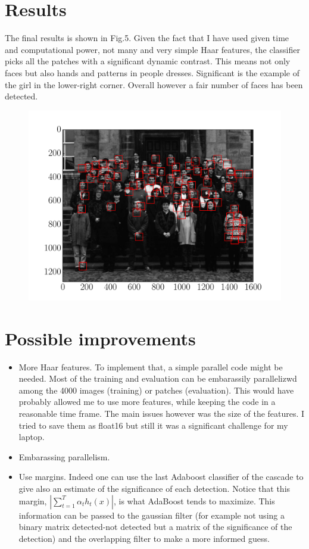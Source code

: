 \documentclass[11pt]{amsart}
\begin{document}
\section{Results}

The final results is shown in Fig.5. 
Given the fact that I have used given time and computational power, not many and very simple Haar features, the classifier picks all the patches with a significant dynamic contrast.
This means not only faces but also hands and patterns in people dresses. Significant is the example of the girl in the lower-right corner. Overall however a fair number of faces has been detected.

\begin{figure}[htbp]
\begin{center}
\includegraphics[scale=0.5]{final.pdf}
\caption{}
\label{default}
\end{center}
\end{figure}

\section{Possible improvements}
\begin{itemize}
\item More Haar features. To implement that, a simple parallel code might be needed. Most of the training and evaluation can be embarassily parallelizwd among the 4000 images (training) or patches (evaluation). This would have probably allowed me to use more features, while keeping the code in a reasonable time frame. The main issues however was the size of the features. I tried to save them as float16 but still it was a significant challenge for my laptop.

\item Embarassing parallelism.
\item Use margins. Indeed one can use the last Adaboost classifier of the cascade to give also an estimate of the significance of each detection. Notice that this margin, $|\sum^{T}_{t=1}\alpha_{t}h_{t}(x)|$, is what AdaBoost tends to maximize. This information can be passed to the gaussian filter (for example not using a binary matrix detected-not detected but a matrix of the significance of the detection) and the overlapping filter to make a more informed guess.
\end{itemize}
\end{document}
